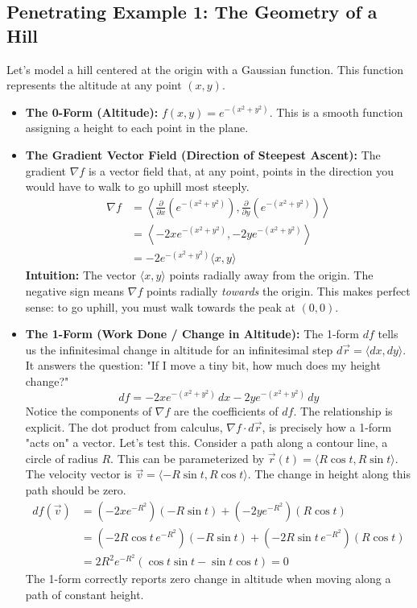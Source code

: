 \documentclass[12pt, letterpaper]{article}
\theoremstyle{definition}
\begin{document}
	\subsection{Penetrating Example 1: The Geometry of a Hill}
	Let's model a hill centered at the origin with a Gaussian function. This function represents the altitude at any point $(x,y)$.
	
	\begin{itemize}
		\item \textbf{The 0-Form (Altitude):} $f(x, y) = e^{-(x^2+y^2)}$. This is a smooth function assigning a height to each point in the plane.
		
		\item \textbf{The Gradient Vector Field (Direction of Steepest Ascent):} The gradient $\nabla f$ is a vector field that, at any point, points in the direction you would have to walk to go uphill most steeply.
		\begin{align*}
			\nabla f &= \left\langle \frac{\partial}{\partial x}\left(e^{-(x^2+y^2)}\right), \frac{\partial}{\partial y}\left(e^{-(x^2+y^2)}\right) \right\rangle \\
			&= \left\langle -2x e^{-(x^2+y^2)}, -2y e^{-(x^2+y^2)} \right\rangle \\
			&= -2e^{-(x^2+y^2)} \langle x, y \rangle
		\end{align*}
		\textbf{Intuition:} The vector $\langle x, y \rangle$ points radially away from the origin. The negative sign means $\nabla f$ points radially \textit{towards} the origin. This makes perfect sense: to go uphill, you must walk towards the peak at $(0,0)$.
		
		\item \textbf{The 1-Form (Work Done / Change in Altitude):} The 1-form $df$ tells us the infinitesimal change in altitude for an infinitesimal step $d\vec{r} = \langle dx, dy \rangle$. It answers the question: "If I move a tiny bit, how much does my height change?"
		\begin{equation*}
			df = -2x e^{-(x^2+y^2)} \, dx - 2y e^{-(x^2+y^2)} \, dy
		\end{equation*}
		Notice the components of $\nabla f$ are the coefficients of $df$. The relationship is explicit. The dot product from calculus, $\nabla f \cdot d\vec{r}$, is precisely how a 1-form "acts on" a vector. Let's test this. Consider a path along a contour line, a circle of radius $R$. This can be parameterized by $\vec{r}(t) = \langle R\cos t, R\sin t \rangle$. The velocity vector is $\vec{v} = \langle -R\sin t, R\cos t \rangle$. The change in height along this path should be zero.
		\begin{align*}
			df(\vec{v}) &= \left(-2x e^{-R^2}\right)(-R\sin t) + \left(-2y e^{-R^2}\right)(R\cos t) \\
			&= \left(-2R\cos t \, e^{-R^2}\right)(-R\sin t) + \left(-2R\sin t \, e^{-R^2}\right)(R\cos t) \\
			&= 2R^2 e^{-R^2} (\cos t \sin t - \sin t \cos t) = 0
		\end{align*}
		The 1-form correctly reports zero change in altitude when moving along a path of constant height.
	\end{itemize}
	
\end{document}
